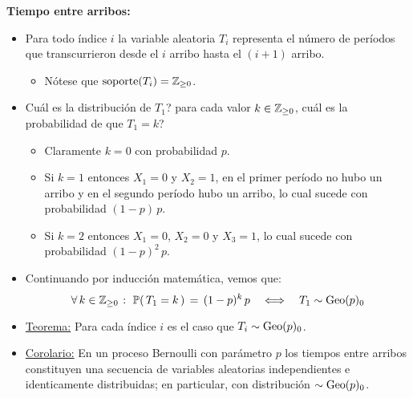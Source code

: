 \documentclass[ 10pt, xcolor = dvipsnames]{beamer}
\begin{document}
\begin{frame}[allowframebreaks]
\frametitle{\insertsection}

\textbf{Tiempo entre arribos:}
\begin{itemize}
\item Para todo \'indice $i$ la variable aleatoria $T_i$ representa el n\'umero de per\'iodos que transcurrieron desde el $i$ arribo hasta el $(i+1)$ arribo. 
\begin{itemize}
\item N\'otese que $\text{soporte}(T_i) = {\mathbb{Z}}_{\geq 0}$. 
\end{itemize}
\item Cu\'al es la distribuci\'on de $T_1$? \Ie para cada valor $k \in {\mathbb{Z}}_{\geq 0}$, cu\'al es la \linebreak probabilidad de que $T_1 = k$? 
\begin{itemize}
\item Claramente $k = 0$ con probabilidad $p$. 
\item Si $k = 1$ entonces $X_1 = 0$ y $X_2 = 1$, \ie en el primer per\'iodo no hubo un arribo y en el segundo per\'iodo hubo un arribo, lo cual sucede con \linebreak probabilidad $(1-p) \, p$. 
\item Si $k = 2$ entonces $X_1 = 0$, $X_2 = 0$ y $X_3 = 1$, lo cual sucede con \linebreak probabilidad $(1-p)^2 \, p$. 
\end{itemize}
\framebreak
\item Continuando por inducci\'on matem\'atica, vemos que: 
\[
\forall \, k \in {\mathbb{Z}}_{\geq 0} \; \colon \; 
\mathbb{P}( \, T_1 = k \, ) \, = \, (1-p)^k \, p 
\quad \Longleftrightarrow \quad T_1 \sim \text{Geo}(p)_0
\]
\item \underline{Teorema:} Para cada \'indice $i$ es el caso que $T_i \sim \text{Geo}(p)_0$. 
\item \underline{Corolario:} En un proceso Bernoulli con par\'ametro $p$ los tiempos entre arribos constituyen una secuencia de variables aleatorias independientes e identicamente distribuidas; en particular, con distribuci\'on $\sim \text{Geo}(p)_0$. 
\end{itemize}

\end{frame}
\end{document}
